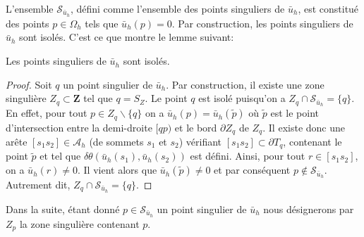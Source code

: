 L'ensemble $\mathcal{S}_{\bar{u}_h}$, défini comme l'ensemble des points singuliers de $\bar{u}_h$, est constitué des points $p \in \Omega_h$ tels que $\bar{u}_h(p) = 0$. Par construction, les points singuliers de $\bar{u}_h$ sont isolés. C'est ce que montre le lemme suivant:

\begin{lemma}
\label{lem:isolation_pt_sing}
    Les points singuliers de $\bar{u}_h$ sont isolés.
\end{lemma}
\begin{proof}
    Soit $q$ un point singulier de $\bar{u}_h$. Par construction, il existe une zone singulière $Z_q\subset\mathbf{Z}$ tel que $q=S_Z$. Le point $q$ est isolé puisqu'on a $Z_q\cap\mathcal{S}_{\bar{u}_h}=\{q\}$. En effet, pour tout $p\in Z_q\backslash\{q\}$ on a $\bar{u}_h(p)=\bar{u}_h(\widetilde{p})$ où $\widetilde{p}$ est le point d'intersection entre la demi-droite $[qp)$ et le bord $\partial Z_q$ de $Z_q$. Il existe donc une arête $[s_1s_2]\in\mathcal{A}_h$ (de sommets $s_1$ et $s_2$) vérifiant $[s_1s_2]\subset\partial T_q$, contenant le point $\widetilde{p}$ et tel que $\delta\theta(\bar{u}_h(s_1), \bar{u}_h(s_2))$ est défini. Ainsi, pour tout $r\in [s_1s_2]$, on a $\bar{u}_h(r)\neq 0$. Il vient alors que $\bar{u}_h(\widetilde{p})\neq 0$ et par conséquent $p\notin \mathcal{S}_{\bar{u}_h}$. Autrement dit, $Z_q\cap\mathcal{S}_{\bar{u}_h}=\{q\}$.
\end{proof}
Dans la suite, étant donné $p\in\mathcal{S}_{\bar{u}_h}$ un point singulier de $\bar{u}_h$ nous désignerons par $Z_p$ la zone singulière contenant $p$.

